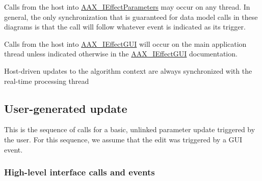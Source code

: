 \begin{DoxyItemize}
\item Calls from the host into \hyperlink{a00099}{A\+A\+X\+\_\+\+I\+Effect\+Parameters} may occur on any thread. In general, the only synchronization that is guaranteed for data model calls in these diagrams is that the call will follow whatever event is indicated as its trigger.
\item Calls from the host into \hyperlink{a00098}{A\+A\+X\+\_\+\+I\+Effect\+G\+U\+I} will occur on the main application thread unless indicated otherwise in the \hyperlink{a00098}{A\+A\+X\+\_\+\+I\+Effect\+G\+U\+I} documentation.
\item Host-\/driven updates to the algorithm context are always synchronized with the real-\/time processing thread
\end{DoxyItemize}\hypertarget{a00353_parameterUpdates_sequences_user}{}\subsection{User-\/generated update}\label{a00353_parameterUpdates_sequences_user}
This is the sequence of calls for a basic, unlinked parameter update triggered by the user. For this sequence, we assume that the edit was triggered by a G\+U\+I event.\hypertarget{a00353_parameterUpdates_sequences_updateSequences_user_highlevel}{}\subsubsection{High-\/level interface calls and events}\label{a00353_parameterUpdates_sequences_updateSequences_user_highlevel}

